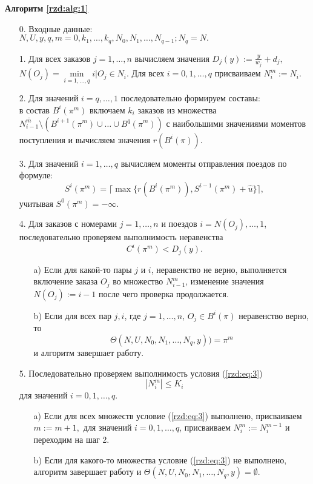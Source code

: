  \begin{algorithm}[H]\label{rzd:alg:1}
 \NoCaptionOfAlgo
\caption{\textbf{Алгоритм \ref{rzd:alg:1}}}
\begin{itemize}
\item[0.] Входные данные:\\
 $N, U, y, q, m=0, k_1, \dots, k_q, N_0, N_1, \dots, N_{q-1}; N_q = N.$
\item[1.] Для всех заказов $j = 1,\dots, n$ вычисляем значения $D_j(y) := \frac{y}{w_j} + d_j,$ $N(O_j) = \min\limits_{i=1, \dots, q} i | O_j \in N_i.$ Для всех $i=0,1, \dots, q$ присваиваем $N_i^m := N_i$.
\item[2.] Для значений $i=q, \dots, 1$ последовательно формируем составы:\\
 в состав $B^i(\pi^m)$ включаем $k_i$ заказов из множества $\overline{N^m_{i-1}} \setminus (B^{i+1}(\pi^m) \cup \dots \cup B^q(\pi^m))$ с наибольшими значениями моментов поступления и вычисляем значения $r(B^i(\pi))$.
\item[3.] Для значений $i=1, \dots, q$ вычисляем моменты отправления поездов по формуле:
$$S^i(\pi^m) = \lceil \max \{r(B^i(\pi^m)), S^{i-1}(\pi^m) + \widehat{u}\} \rceil,$$
учитывая $S^0(\pi^m) = -\infty.$
\item[4.] Для заказов с номерами $j=1, \dots, n$ и поездов $i=N(O_j), \dots, 1$, последовательно проверяем выполнимость неравенства
$$C^i(\pi^m) < D_j(y).$$
 \begin{itemize}
    \item[a)] Если для какой-то пары $j$ и $i$, неравенство не верно, выполняется включение заказа $O_j$ во множество $N^m_{i-1}$, изменение значения $N(O_j) := i-1$ после чего проверка продолжается.
    \item[b)] Если для всех пар $j, i$, где $j=1, \dots, n$, $O_j \in B^i(\pi)$ неравенство верно, то
    $$\Theta(N,U,N_0, N_1, \dots, N_q, y)) = \pi^m$$
     и алгоритм завершает работу.
 \end{itemize}
\item[5.] Последовательно проверяем выполнимость условия (\ref{rzd:eq:3})
$$|N^m_i| \leq K_i$$
 для значений $i=0,1, \dots, q.$
    \begin{itemize}
    \item[a)] Если для всех множеств условие (\ref{rzd:eq:3}) выполнено, присваиваем $m:=m+1,$ для значений $i=0,1, \dots, q$, присваиваем $N_i^m := N_i^{m-1}$ и переходим на шаг 2.
    \item[b)] Если для какого-то множества условие (\ref{rzd:eq:3}) не выполнено, алгоритм завершает работу и $\Theta(N,U,N_0, N_1, \dots, N_q, y) = \emptyset$.
    \end{itemize}
\end{itemize}
\end{algorithm}

